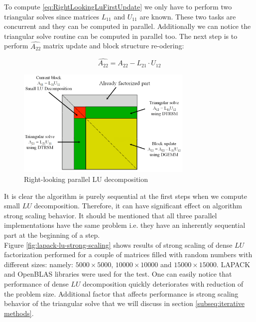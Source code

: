 To compute \ref{eq:RightLookingLuFirstUpdate} we only have to perform two triangular solves since matrices $L_{11}$ and $U_{11}$ are known. These two tasks are concurrent and they can be computed in parallel. Additionally we can notice the triangular solve routine can be computed in parallel too. The next step is to perform $\hat{A_{22}}$ matrix update and block structure re-odering:

\begin{equation} \label{eq:RightLookingLuSecondUpdate}
\hat{A_{22}} = A_{22} - L_{21} \cdot U_{12}
\end{equation}


\begin{figure}[htpb]
  \centering
  \includegraphics[width=0.75\textwidth]{figures/chapter-2/right-looking-la.png}
\caption{Right-looking parallel LU decomposition}
\label{fig:RightLookingLuReodering}
\end{figure}


It is clear the algorithm is purely sequential at the first steps when we compute small $LU$ decomposition. Therefore, it can have significant effect on algorithm strong scaling behavior. It should be mentioned that all three parallel implementations have the same problem i.e. they have an inherently sequential part at the beginning of a step. \\

Figure \ref{fig:lapack-lu-strong-scaling} shows results of strong scaling of dense $LU$ factorization performed for a couple of matrices filled with random numbers with different sizes: namely: $5000 \times 5000$, $10000 \times 10000$ and $15000 \times 15000$. LAPACK and OpenBLAS libraries were used for the test. One can easily notice that performance of dense $LU$ decomposition quickly deteriorates with reduction of the problem size. Additional factor that affects performance is strong scaling behavior of the triangular solve that we will discuss in section \ref{subseq:iterative methods}. 


